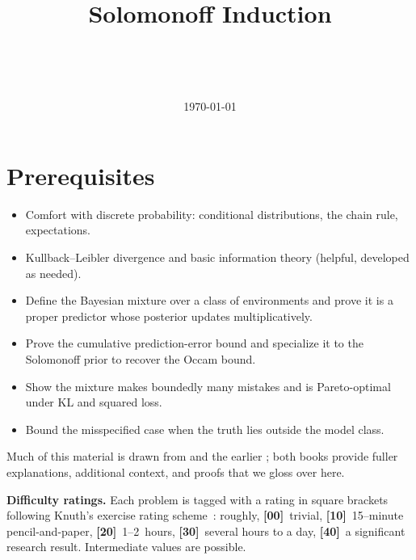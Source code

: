 \documentclass[fontsize=11pt, parskip=half]{scrartcl}
\begin{document}
\title{Solomonoff Induction}
\author{\\ 
  \and {}\\ }
\date{\today}
\maketitle

\section*{Prerequisites}

\begin{itemize}
    \item Comfort with discrete probability: conditional distributions, the chain
    rule, expectations.
    \item Kullback--Leibler divergence and basic information theory (helpful,
    developed as needed).
\end{itemize}

\begin{learningoutcomes}
  \begin{itemize}
    \item Define the Bayesian mixture over a class of environments and prove it is a proper predictor whose posterior updates multiplicatively.
    \item Prove the cumulative prediction-error bound and specialize it to the Solomonoff prior to recover the Occam bound.
    \item Show the mixture makes boundedly many mistakes and is Pareto-optimal under KL and squared loss.
    \item Bound the misspecified case when the truth lies outside the model class.
  \end{itemize}
\end{learningoutcomes}

\medskip
\noindent
Much of this material is drawn from \cite[Chapter 3]{Hutter:24uaibook2}
and the earlier \cite{Hutter:04uaibook}; both books provide fuller explanations, additional context, and proofs that we gloss over here.

\medskip
\noindent
\textbf{Difficulty ratings.} Each problem is tagged with a rating in square brackets following Knuth's exercise rating scheme~\cite{Knuth:73a}: roughly, \textbf{[00]}~trivial, \textbf{[10]}~15--minute pencil-and-paper, \textbf{[20]}~1--2~hours, \textbf{[30]}~several hours to a day, \textbf{[40]}~a significant research result. Intermediate values are possible.
\end{document}
